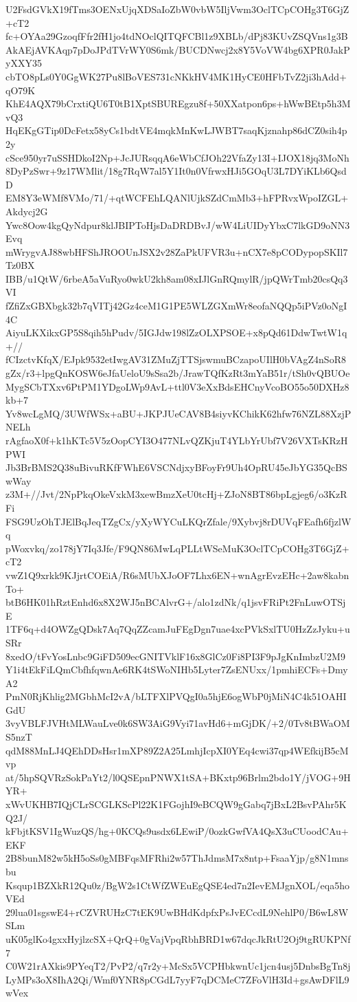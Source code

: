 U2FsdGVkX19fTms3OENxUjqXDSaIoZbW0vbW5IljVwm3OclTCpCOHg3T6GjZ+cT2
fc+OYAa29GzoqfFfr2fH1jo4tdNOclQITQFCBl1z9XBLb/dPj83KUvZSQVns1g3B
AkAEjAVKAqp7pDoJPdTVrWY0S6mk/BUCDNwcj2x8Y5VoVW4bg6XPR0JakPyXXY35
cbTO8pLs0Y0GgWK27Pu8lBoVES731cNKkHV4MK1HyCE0HFbTvZ2ji3hAdd+qO79K
KhE4AQX79bCrxtiQU6T0tB1XptSBUREgzu8f+50XXatpon6ps+hWwBEtp5h3MvQ3
HqEKgGTip0DcFetx58yCs1bdtVE4mqkMnKwLJWBT7saqKjznahp86dCZ0sih4p2y
cSce950yr7uSSHDkoI2Np+JcJURsqqA6eWbCfJOh22VfaZy13I+IJOX18jq3MoNh
8DyPzSwr+9z17WMlit/18g7RqW7al5Y1It0n0VfrwxHJi5GOqU3L7DYiKLb6QsdD
EM8Y3eWMf8VMo/71/+qtWCFEhLQANlUjkSZdCmMb3+hFPRvxWpoIZGL+Akdycj2G
Ywc8Oow4kgQyNdpur8klJBIPToHjsDaDRDBvJ/wW4LiUIDyYbxC7lkGD9oNN3Evq
mWrygvAJ88wbHFShJROOUnJSX2v28ZaPkUFVR3u+nCX7e8pCODypopSKIl7Tz0BX
IBB/u1QtW/6rbeA5aVuRyo0wkU2kh8am08xIJlGnRQmylR/jpQWrTmb20csQq3VI
fZfiZxGBXbgk32b7qVITj42Gz4ceM1G1PE5WLZGXmWr8eofaNQQp5iPVz0oNgI4C
AiyuLKXikxGP5S8qih5hPudv/5IGJdw198lZzOLXPSOE+x8pQd61DdwTwtW1q+//
fCIzctvKfqX/EJpk9532etIwgAV31ZMuZjTTSjswmuBCzapoUIlH0bVAgZ4nSoR8
gZx/r3+lpgQnKOSW6eJfaUeloU9sSsa2b/JrawTQfKzRt3mYaB51r/tSh0vQBUOe
MygSCbTXxv6PtPM1YDgoLWp9AvL+ttl0V3eXxBdsEHCnyVcoBO55o50DXHz8kb+7
Yv8wcLgMQ/3UWfWSx+aBU+JKPJUeCAV8B4siyvKChikK62hfw76NZL88XzjPNELh
rAgfaoX0f+k1hKTc5V5zOopCYI3O477NLvQZKjuT4YLbYrUbf7V26VXTsKRzHPWI
Jb3BrBMS2Q38uBivuRKfFWhE6VSCNdjxyBFoyFr9Uh4OpRU45eJbYG35QcBSwWay
z3M+//Jvt/2NpPkqOkeVxkM3xewBmzXeU0tcHj+ZJoN8BT86bpLgjeg6/o3KzRFi
FSG9UzOhTJElBqJeqTZgCx/yXyWYCuLKQrZfale/9Xybvj8rDUVqFEafh6fjzlWq
pWoxvkq/zo178jY7Iq3Jfe/F9QN86MwLqPLLtWSeMuK3OclTCpCOHg3T6GjZ+cT2
vwZ1Q9xrkk9KJjrtCOEiA/R6sMUbXJoOF7Lhx6EN+wnAgrEvzEHc+2aw8kabnTo+
btB6HK01hRztEnhd6x8X2WJ5nBCAlvrG+/alo1zdNk/q1jsvFRiPt2FnLuwOTSjE
1TF6q+d4OWZgQDsk7Aq7QqZZcamJuFEgDgn7uae4xcPVkSxlTU0HzZzJyku+uSRr
8xedO/tFvYosLnbc9GiFD509ecGNITVklF16x8GlCz0Fi8PI3F9pJgKnImbzU2M9
Y1i4tEkFiLQmCbfhfqwnAe6RK4tSWoNIHb5Lyter7ZsENUxx/1pmhiECFs+DmyA2
PmN0RjKhlig2MGbhMcI2vA/bLTFXlPVQgI0a5hjE6ogWbP0jMiN4C4k51OAHIGdU
3vyVBLFJVHtMLWauLve0k6SW3AiG9Vyi71avHd6+mGjDK/+2/0Tv8tBWaOMS5nzT
qdM88MnLJ4QEhDDsHsr1mXP89Z2A25LmhjIcpXI0YEq4cwi37qp4WEfkijB5cMvp
at/5hpSQVRzSokPaYt2/l0QSEpnPNWX1tSA+BKxtp96Brlm2bdo1Y/jVOG+9HYR+
xWvUKHB7IQjCLrSCGLKScPl22K1FGojhI9eBCQW9gGabq7jBxL2BsvPAhr5KQ2J/
kFbjtKSV1IgWuzQS/hg+0KCQs9usdx6LEwiP/0ozkGwfVA4QsX3uCUoodCAu+EKF
2B8bunM82w5kH5oSs0gMBFqsMFRhi2w57ThJdmsM7x8ntp+FsaaYjp/g8N1mnsbu
Ksqup1BZXkR12Qu0z/BgW2s1CtWfZWEuEgQSE4ed7n2IevEMJgnXOL/eqa5hoVEd
29lua01sgswE4+rCZVRUHzC7tEK9UwBHdKdpfxPsJvECcdL9NehlP0/B6wL8WSLm
uK05glKo4gxxHyjlzcSX+QrQ+0gVajVpqRbhBRD1w67dqcJkRtU2Oj9tgRUKPNf7
C0W21rAXkis9PYeqT2/PvP2/q7r2y+McSx5VCPHbkwnUc1jcn4usj5DnbsBgTn8j
LyMPs3oX8IhA2Qi/Wmf0YNR8pCGdL7yyF7qDCMeC7ZFoVlH3Id+gsAwDFlL9wVex
